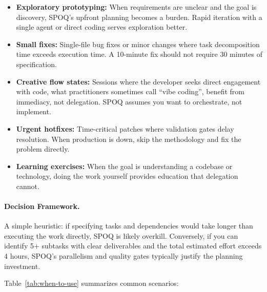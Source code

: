 \begin{itemize}
    \item \textbf{Exploratory prototyping:} When requirements are
    unclear and the goal is discovery, SPOQ's upfront planning becomes
    a burden. Rapid iteration with a single agent or direct coding
    serves exploration better.

    \item \textbf{Small fixes:} Single-file bug fixes or minor changes
    where task decomposition time exceeds execution time. A 10-minute
    fix should not require 30 minutes of specification.

    \item \textbf{Creative flow states:} Sessions where the developer
    seeks direct engagement with code, what practitioners sometimes
    call ``vibe coding'', benefit from immediacy, not delegation.
    SPOQ assumes you want to orchestrate, not implement.

    \item \textbf{Urgent hotfixes:} Time-critical patches where
    validation gates delay resolution. When production is down,
    skip the methodology and fix the problem directly.

    \item \textbf{Learning exercises:} When the goal is understanding
    a codebase or technology, doing the work yourself provides
    education that delegation cannot.
\end{itemize}

\paragraph{Decision Framework.}
A simple heuristic: if specifying tasks and dependencies would take
longer than executing the work directly, SPOQ is likely overkill.
Conversely, if you can identify 5+ subtasks with clear deliverables
and the total estimated effort exceeds 4 hours, SPOQ's parallelism
and quality gates typically justify the planning investment.

Table~\ref{tab:when-to-use} summarizes common scenarios:

